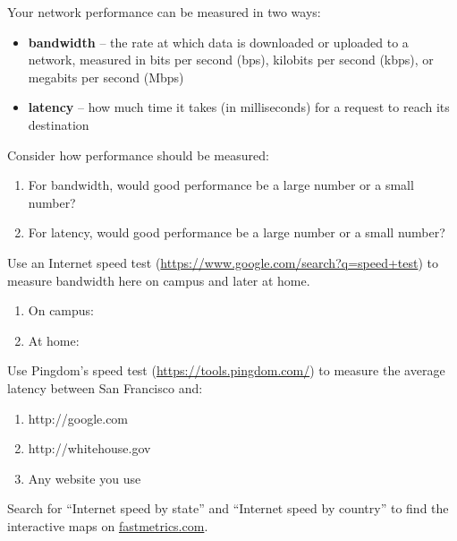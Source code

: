
Your network performance can be measured in two ways:

\begin{itemize}[itemsep=0pt]
\item \textbf{bandwidth} -- the rate at which data is downloaded or uploaded to a network, measured in bits per second (bps), kilobits per second (kbps), or megabits per second (Mbps)
\item \textbf{latency} -- how much time it takes (in milliseconds) for a request to reach its destination
\end{itemize}




\Q Consider how performance should be measured:
\begin{enumerate}
\item For bandwidth, would good performance be a large number or a small number?
\item For latency, would good performance be a large number or a small number?
\end{enumerate}


\Q Use an Internet speed test (\url{https://www.google.com/search?q=speed+test}) to measure bandwidth here on campus and later at home.
\begin{enumerate}
\item On campus: 
\item At home: 
\end{enumerate}


\Q Use Pingdom's speed test (\url{https://tools.pingdom.com/}) to measure the average latency between San Francisco and:
\begin{enumerate}
\item http://google.com 
\item http://whitehouse.gov 
\item Any website you use 
\end{enumerate}


\Q Search for ``Internet speed by state'' and ``Internet speed by country'' to find the interactive maps on \href{https://www.fastmetrics.com/sitemap.php}{fastmetrics.com}.

